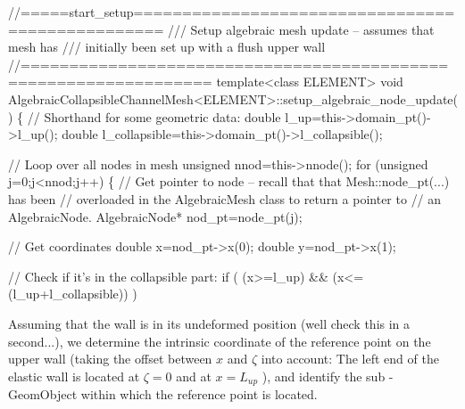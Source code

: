  
\begin{DoxyCodeInclude}
\textcolor{comment}{//=====start\_setup=================================================}
\textcolor{comment}{/// Setup algebraic mesh update -- assumes that mesh has}
\textcolor{comment}{}\textcolor{comment}{/// initially been set up with a flush upper wall}
\textcolor{comment}{}\textcolor{comment}{//=================================================================}
\textcolor{keyword}{template}<\textcolor{keyword}{class} ELEMENT>
\textcolor{keywordtype}{void} AlgebraicCollapsibleChannelMesh<ELEMENT>::setup\_algebraic\_node\_update()
\{
 \textcolor{comment}{// Shorthand for some geometric data:}
 \textcolor{keywordtype}{double} l\_up=this->domain\_pt()->l\_up();
 \textcolor{keywordtype}{double} l\_collapsible=this->domain\_pt()->l\_collapsible();

 \textcolor{comment}{// Loop over all nodes in mesh}
 \textcolor{keywordtype}{unsigned} nnod=this->nnode();
 \textcolor{keywordflow}{for} (\textcolor{keywordtype}{unsigned} j=0;j<nnod;j++)
  \{
   \textcolor{comment}{// Get pointer to node -- recall that that Mesh::node\_pt(...) has been}
   \textcolor{comment}{// overloaded in the AlgebraicMesh class to return a pointer to }
   \textcolor{comment}{// an AlgebraicNode.}
   AlgebraicNode* nod\_pt=node\_pt(j);

   \textcolor{comment}{// Get coordinates}
   \textcolor{keywordtype}{double} x=nod\_pt->x(0);
   \textcolor{keywordtype}{double} y=nod\_pt->x(1);

   \textcolor{comment}{// Check if it's in the collapsible part:}
   \textcolor{keywordflow}{if} ( (x>=l\_up) && (x<=(l\_up+l\_collapsible)) )

\end{DoxyCodeInclude}


Assuming that the wall is in its undeformed position (we\textquotesingle{}ll check this in a second...), we determine the intrinsic coordinate of the reference point on the upper wall (taking the offset between $ x$ and $ \zeta$ into account\+: The left end of the elastic wall is located at $ \zeta=0$ and at $ x = L_{up} $ ), and identify the sub -\/ {\ttfamily Geom\+Object} within which the reference point is located.


